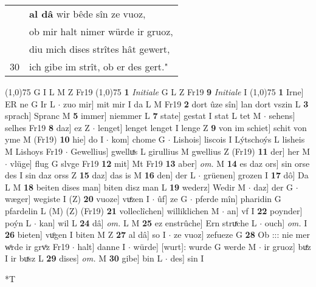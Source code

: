 \documentclass[8pt,a4paper,notitlepage]{article}
\begin{document}
\begin{table}[ht]
\begin{minipage}[t]{0.5\linewidth}
\begin{tabular}{rl}
 & \textbf{al dâ} wir bêde sîn ze vuoz,\\ 
 & ob mir halt nimer würde ir gruoz,\\ 
 & diu mich dises strîtes hât gewert,\\ 
30 & ich gibe im strît, ob er des gert."\\ 
\end{tabular}
\scriptsize
\line(1,0){75} \newline
G I L M Z Fr19 \newline
\line(1,0){75} \newline
\textbf{1} \textit{Initiale} G L Z Fr19  \textbf{9} \textit{Initiale} I  \newline
\line(1,0){75} \newline
\textbf{1} Irne] ER ne G Ir L  $\cdot$ zuo mir] mit mir I da L M Fr19 \textbf{2} dort ûze sîn] lan dort vszin L \textbf{3} sprach] Spranc M \textbf{5} immer] niemmer L \textbf{7} state] gestat I stat L tet M  $\cdot$ sehens] selhes Fr19 \textbf{8} daz] ez Z  $\cdot$ lenget] lenget lenget I lenge Z \textbf{9} von im schiet] schit von yme M (Fr19) \textbf{10} hie] do I  $\cdot$ kom] chome G  $\cdot$ Lishois] liscois I Lýtschoýs L lisheis M Lishoys Fr19  $\cdot$ Gewellius] gwelluͯs L girullius M gwellius Z (Fr19) \textbf{11} der] her M  $\cdot$ vlüge] flug G slvge Fr19 \textbf{12} mit] Mt Fr19 \textbf{13} aber] \textit{om.} M \textbf{14} es daz ors] sin orse des I sin daz orss Z \textbf{15} daz] das is M \textbf{16} den] der L  $\cdot$ grüenen] grozen I \textbf{17} dô] Da L M \textbf{18} beiten dises man] biten disz man L \textbf{19} wederz] Wedir M  $\cdot$ daz] der G  $\cdot$ wæger] wegiste I (Z) \textbf{20} vuoze] vuͤzen I  $\cdot$ ûf] ze G  $\cdot$ pferde mîn] pharidin G pfardelin L (M) (Z) (Fr19) \textbf{21} volleclîchen] williklichen M  $\cdot$ an] vf I \textbf{22} poynder] poýn L  $\cdot$ kan] wil L \textbf{24} dâ] \textit{om.} L M \textbf{25} ez enstrûche] Ern struͯche L  $\cdot$ ouch] \textit{om.} I \textbf{26} bieten] vuͦgen I biten M Z \textbf{27} al dâ] so I  $\cdot$ ze vuoz] zefueze G \textbf{28} Ob ::: nie mer wͦrde ir grvͦz Fr19  $\cdot$ halt] danne I  $\cdot$ würde] [wurt]: wurde G werde M  $\cdot$ ir gruoz] buͤz I ir buͯsz L \textbf{29} dises] \textit{om.} M \textbf{30} gibe] bin L  $\cdot$ des] sin I \newline
\end{minipage}
\hspace{0.5cm}
\begin{minipage}[t]{0.5\linewidth}
\small
\begin{center}*T

\end{center}
\end{minipage}
\end{table}
\end{document}
